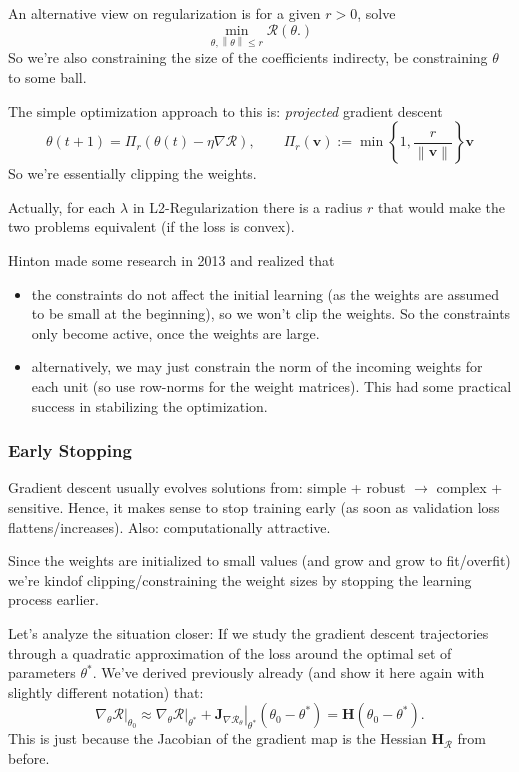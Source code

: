\documentclass[a2paper,8pt]{extarticle}
\newcommand{\cR}{\mathcal{R}}
\newcommand{\set}[1]{\left\{ #1 \right\}}
\newcommand{\norm}[1]{\left\lVert #1 \right\rVert}
\newcommand{\mat}[1]{\mathbf{#1}}
\renewcommand{\vec}[1]{\mathbf{#1}}
\newcommand{\vv}{\vec{v}}
\newcommand{\MH}{\mat{H}}
\newcommand{\MJ}{\mat{J}}
\newcommand{\evalat}[2]{\left. #1 \right|_{#2}}
\newcommand{\ssep}{\hdashrule[1.1ex]{\linewidth}{0.1pt}{0.3mm}\vspace{-6pt}}
\newcommand{\ssep}{\hdashrule[1.1ex]{\linewidth}{0.1pt}{0.3mm}\vspace{-3pt}}
\begin{document}
\begin{landscape}
\begin{multicols*}{7}
An alternative view on regularization is for a given $r>0$, solve
\[
\min_{\theta, \norm{\theta}\leq r}
\cR(\theta.)
\]
So we're also constraining the size of the coefficients indirecty, be
constraining $\theta$ to some ball.

\ssep

The simple optimization approach to this is: \emph{projected} gradient descent
\[
\theta(t+1)
=
\Pi_r(\theta(t)-\eta\nabla\cR),
\qquad
\Pi_r(\vv):=
\min\set{1,\frac{r}{\norm{\vv}}}\vv
\]
So we're essentially clipping the weights.

\ssep

Actually, for each $\lambda$ in L2-Regularization there is a radius $r$ that
would make the two problems equivalent (if the loss is convex).

\ssep

Hinton made some research in 2013 and realized that
\begin{itemize}
  \item the constraints do not affect the initial learning (as the weights are
  assumed to be small at the beginning), so we won't clip the weights. So the
  constraints only become active, once the weights are large.
  \item alternatively, we may just constrain the norm of the incoming weights
  for each unit (so use row-norms for the weight matrices). This had some
  practical success in stabilizing the optimization.
\end{itemize}

\subsubsection{Early Stopping}

Gradient descent usually evolves solutions from: simple + robust $\to$ complex +
sensitive. Hence, it makes sense to stop training early (as soon as validation
loss flattens/increases). Also: computationally attractive.

Since the weights are initialized to small values (and grow and grow to
fit/overfit) we're kindof clipping/constraining the weight
sizes by stopping the learning process earlier.

Let's analyze the situation closer: If we study the gradient descent
trajectories through a quadratic approximation of the loss around the optimal
set of parameters $\theta^*$. We've derived previously already (and show it
here again with slightly different notation) that:
\[
\evalat{\nabla_{\theta}\cR}{\theta_0}
\approx
\evalat{\nabla_{\theta}\cR}{\theta^*}
+
\evalat{\MJ_{\nabla\cR_{\theta}}}{\theta^*}
(\theta_0-\theta^*)
=
\MH(\theta_0-\theta^*).
\]
This is just because the Jacobian of the gradient map is the Hessian
$\MH_{\cR}$ from before.


\end{multicols*}
\end{landscape}
\end{document}
